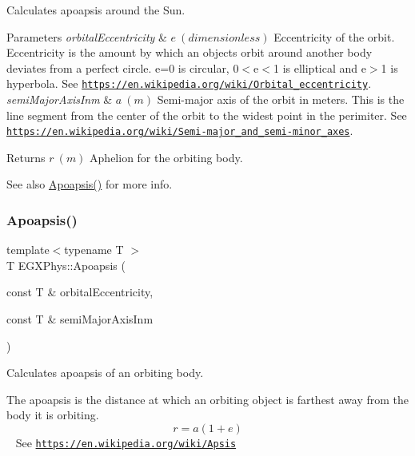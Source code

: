 Calculates apoapsis around the Sun. 


\begin{DoxyParams}{Parameters}
{\em orbital\+Eccentricity} & $ e\ (dimensionless)$ Eccentricity of the orbit. Eccentricity is the amount by which an objects orbit around another body deviates from a perfect circle. e=0 is circular, 0$<$e$<$1 is elliptical and e$>$1 is hyperbola. See \href{https://en.wikipedia.org/wiki/Orbital_eccentricity}{\tt https\+://en.\+wikipedia.\+org/wiki/\+Orbital\+\_\+eccentricity}. \\
\hline
{\em semi\+Major\+Axis\+Inm} & $ a\ (m)$ Semi-\/major axis of the orbit in meters. This is the line segment from the center of the orbit to the widest point in the perimiter. See \href{https://en.wikipedia.org/wiki/Semi-major_and_semi-minor_axes}{\tt https\+://en.\+wikipedia.\+org/wiki/\+Semi-\/major\+\_\+and\+\_\+semi-\/minor\+\_\+axes}. \\
\hline
\end{DoxyParams}
\begin{DoxyReturn}{Returns}
$ r\ (m)$ Aphelion for the orbiting body. 
\end{DoxyReturn}
\begin{DoxySeeAlso}{See also}
\mbox{\hyperlink{group___e_g_x_phys-_apoapsis_gafd08a2d1d64886e7bb9bcb7ff65bc3ea}{Apoapsis()}} for more info. 
\end{DoxySeeAlso}
\mbox{\label{group___e_g_x_phys-_apoapsis_gafd08a2d1d64886e7bb9bcb7ff65bc3ea}} 
\subsubsection{\texorpdfstring{Apoapsis()}{Apoapsis()}}
{\footnotesize\ttfamily template$<$typename T $>$ \\
T E\+G\+X\+Phys\+::\+Apoapsis (\begin{DoxyParamCaption}\item[{const T \&}]{orbital\+Eccentricity,  }\item[{const T \&}]{semi\+Major\+Axis\+Inm }\end{DoxyParamCaption})}



Calculates apoapsis of an orbiting body. 

The apoapsis is the distance at which an orbiting object is farthest away from the body it is orbiting. \[r=a(1+e)\] ~\newline
See \href{https://en.wikipedia.org/wiki/Apsis}{\tt https\+://en.\+wikipedia.\+org/wiki/\+Apsis}

